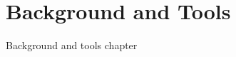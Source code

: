 
\chapter{Background and Tools} \label{chap:backgroundAndToolsChapter}

Background and tools chapter